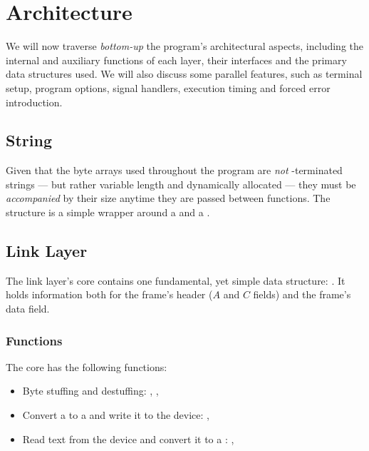 \documentclass[main.tex]{subfiles}
\begin{document}
\section{Architecture}
\label{sec:arch}

We will now traverse \textit{bottom-up} the program's architectural aspects, including the internal and auxiliary functions of each layer, their interfaces and the primary data structures used. We will also discuss some parallel features, such as terminal setup, program options, signal handlers, execution timing and forced error introduction.

\subsection{String}
\label{subsec:string}

Given that the byte arrays used throughout the program are \emph{not} \nullp-terminated strings --- but rather variable length and dynamically allocated --- they must be \textit{accompanied} by their size anytime they are passed between functions. The  structure is a simple wrapper around a  and a .

\subsection{Link Layer}
\label{subsec:llarch}

The link layer's core contains one fundamental, yet simple data structure: . It holds information both for the frame's header ($A$ and $C$ fields) and the frame's data field.

\subsubsection{Functions}
\label{subsubsec:funcllarch}

The core has the following functions:

\begin{itemize}[noitemsep,rightmargin=3em]
	\item Byte stuffing and destuffing: , , 
	\item Convert a  to a  and write it to the device: , 
	\item Read text from the device and convert it to a :
	, 
\end{itemize}
\end{document}
